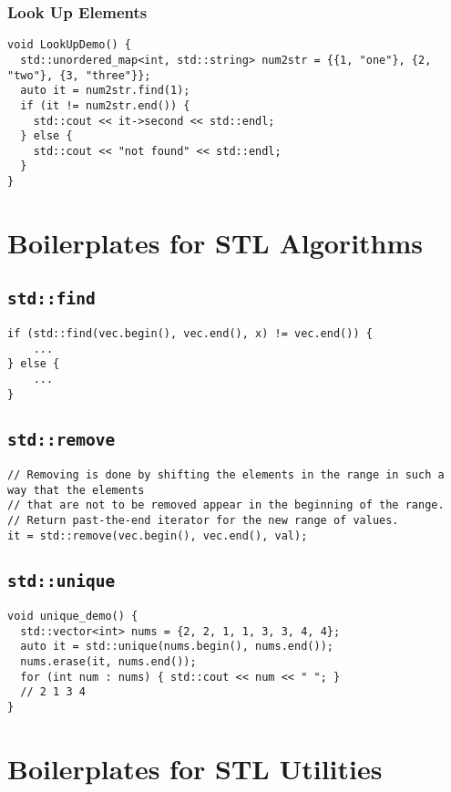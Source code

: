 \subsection{Look Up Elements}
\begin{lstlisting}
void LookUpDemo() {
  std::unordered_map<int, std::string> num2str = {{1, "one"}, {2, "two"}, {3, "three"}};
  auto it = num2str.find(1);
  if (it != num2str.end()) {
    std::cout << it->second << std::endl;
  } else {
    std::cout << "not found" << std::endl;
  }
}
\end{lstlisting}

\chapter{Boilerplates for STL Algorithms}
\section{{\colorbox{CodeBackground}{\lstinline|std::find|}}}
\begin{lstlisting}
if (std::find(vec.begin(), vec.end(), x) != vec.end()) {
	...
} else {
	...
}
\end{lstlisting}

\section{{\colorbox{CodeBackground}{\lstinline|std::remove|}}}
\begin{lstlisting}
// Removing is done by shifting the elements in the range in such a way that the elements 
// that are not to be removed appear in the beginning of the range.
// Return past-the-end iterator for the new range of values.
it = std::remove(vec.begin(), vec.end(), val);
\end{lstlisting}

\section{{\colorbox{CodeBackground}{\lstinline|std::unique|}}}
\begin{lstlisting}
void unique_demo() {
  std::vector<int> nums = {2, 2, 1, 1, 3, 3, 4, 4};
  auto it = std::unique(nums.begin(), nums.end());
  nums.erase(it, nums.end());
  for (int num : nums) { std::cout << num << " "; }
  // 2 1 3 4
}
\end{lstlisting}

\chapter{Boilerplates for STL Utilities}

